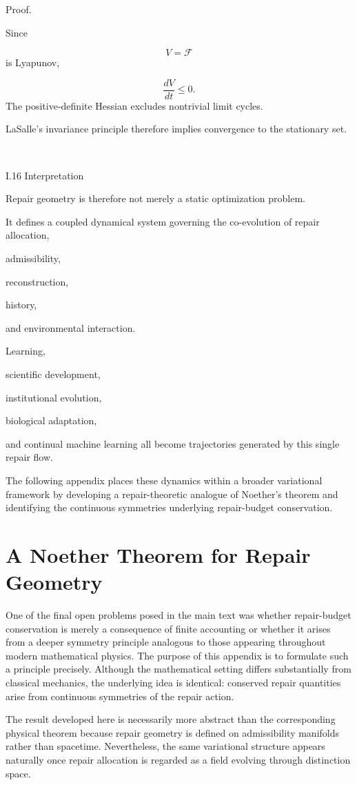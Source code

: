 \documentclass[12pt,oneside]{article}
\theoremstyle{plain}
\theoremstyle{definition}
\theoremstyle{remark}
\begin{document}
Proof.

Since

\[
V=\mathcal F
\]
is Lyapunov,

\[
\frac{dV}{dt}\le0.
\]
The positive-definite Hessian excludes nontrivial limit cycles.

LaSalle's invariance principle therefore implies convergence to the stationary set.

\square


I.16 Interpretation

Repair geometry is therefore not merely a static optimization problem.

It defines a coupled dynamical system governing the co-evolution of repair allocation,

admissibility,

reconstruction,

history,

and environmental interaction.

Learning,

scientific development,

institutional evolution,

biological adaptation,

and continual machine learning all become trajectories generated by this single repair flow.

The following appendix places these dynamics within a broader variational framework by developing a repair-theoretic analogue of Noether's theorem and identifying the continuous symmetries underlying repair-budget conservation.

\section{A Noether Theorem for Repair Geometry}

One of the final open problems posed in the main text was whether repair-budget conservation is merely a consequence of finite accounting or whether it arises from a deeper symmetry principle analogous to those appearing throughout modern mathematical physics. The purpose of this appendix is to formulate such a principle precisely. Although the mathematical setting differs substantially from classical mechanics, the underlying idea is identical: conserved repair quantities arise from continuous symmetries of the repair action.

The result developed here is necessarily more abstract than the corresponding physical theorem because repair geometry is defined on admissibility manifolds rather than spacetime. Nevertheless, the same variational structure appears naturally once repair allocation is regarded as a field evolving through distinction space.
\end{document}
